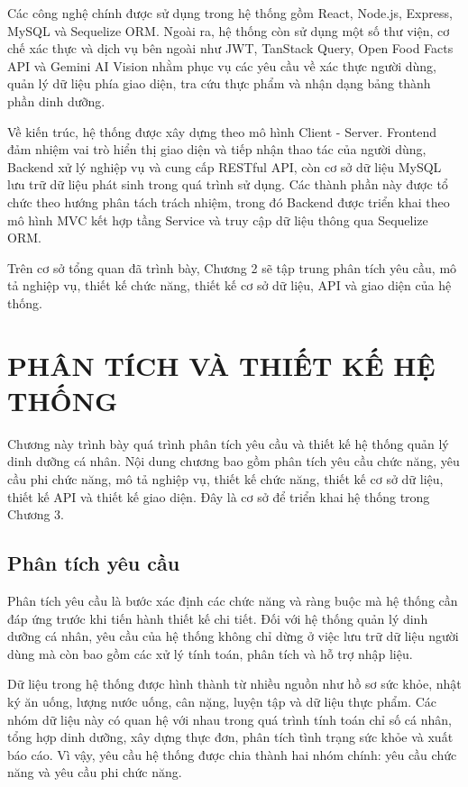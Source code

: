 \documentclass[12pt, a4paper]{report}
\begin{document}
Các công nghệ chính được sử dụng trong hệ thống gồm React, Node.js, Express, MySQL và Sequelize ORM. Ngoài ra, hệ thống còn sử dụng một số thư viện, cơ chế xác thực và dịch vụ bên ngoài như JWT, TanStack Query, Open Food Facts API và Gemini AI Vision nhằm phục vụ các yêu cầu về xác thực người dùng, quản lý dữ liệu phía giao diện, tra cứu thực phẩm và nhận dạng bảng thành phần dinh dưỡng.

Về kiến trúc, hệ thống được xây dựng theo mô hình Client - Server. Frontend đảm nhiệm vai trò hiển thị giao diện và tiếp nhận thao tác của người dùng, Backend xử lý nghiệp vụ và cung cấp RESTful API, còn cơ sở dữ liệu MySQL lưu trữ dữ liệu phát sinh trong quá trình sử dụng. Các thành phần này được tổ chức theo hướng phân tách trách nhiệm, trong đó Backend được triển khai theo mô hình MVC kết hợp tầng Service và truy cập dữ liệu thông qua Sequelize ORM.

Trên cơ sở tổng quan đã trình bày, Chương 2 sẽ tập trung phân tích yêu cầu, mô tả nghiệp vụ, thiết kế chức năng, thiết kế cơ sở dữ liệu, API và giao diện của hệ thống.


\chapter{PHÂN TÍCH VÀ THIẾT KẾ HỆ THỐNG}
Chương này trình bày quá trình phân tích yêu cầu và thiết kế hệ thống quản lý dinh dưỡng cá nhân. Nội dung chương bao gồm phân tích yêu cầu chức năng, yêu cầu phi chức năng, mô tả nghiệp vụ, thiết kế chức năng, thiết kế cơ sở dữ liệu, thiết kế API và thiết kế giao diện. Đây là cơ sở để triển khai hệ thống trong Chương 3.

\section{Phân tích yêu cầu}Phân tích yêu cầu là bước xác định các chức năng và ràng buộc mà hệ thống cần đáp ứng trước khi tiến hành thiết kế chi tiết. Đối với hệ thống quản lý dinh dưỡng cá nhân, yêu cầu của hệ thống không chỉ dừng ở việc lưu trữ dữ liệu người dùng mà còn bao gồm các xử lý tính toán, phân tích và hỗ trợ nhập liệu.

Dữ liệu trong hệ thống được hình thành từ nhiều nguồn như hồ sơ sức khỏe, nhật ký ăn uống, lượng nước uống, cân nặng, luyện tập và dữ liệu thực phẩm. Các nhóm dữ liệu này có quan hệ với nhau trong quá trình tính toán chỉ số cá nhân, tổng hợp dinh dưỡng, xây dựng thực đơn, phân tích tình trạng sức khỏe và xuất báo cáo. Vì vậy, yêu cầu hệ thống được chia thành hai nhóm chính: yêu cầu chức năng và yêu cầu phi chức năng.
\end{document}
